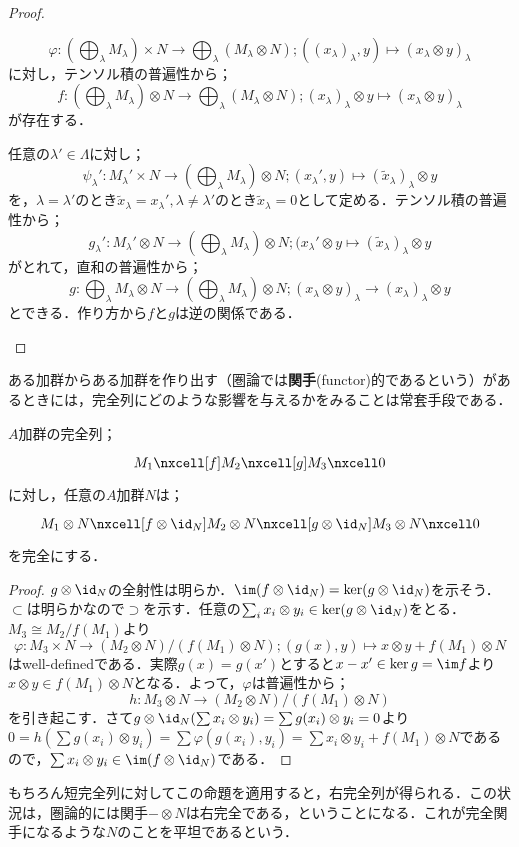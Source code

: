 \begin{proof}
\begin{step}
	\begin{mrkw}
		\item \[\varphi:\left(\bigoplus_\lambda M_\lambda\right)\times N\to\bigoplus_\lambda(M_\lambda\otimes N);((x_\lambda)_\lambda,y)\mapsto(x_\lambda\otimes y)_\lambda\]
		に対し，テンソル積の普遍性から；
		\[f:\left(\bigoplus_\lambda M_\lambda\right)\otimes N\to \bigoplus_\lambda(M_\lambda\otimes N);(x_\lambda)_\lambda\otimes y\mapsto(x_\lambda\otimes y)_\lambda\]
		が存在する．
		\item 任意の$\lambda'\in\Lambda$に対し；
		\[\psi_\lambda':M_\lambda'\times N\to\left(\bigoplus_\lambda M_\lambda\right)\otimes N;(x_\lambda',y)\mapsto(\tilde{x}_\lambda)_\lambda\otimes y\]
		を，$\lambda=\lambda'$のとき$\tilde{x}_\lambda=x_\lambda',\lambda\neq\lambda'$のとき$\tilde{x}_\lambda=0$として定める．テンソル積の普遍性から；
		\[g_\lambda':M_\lambda'\otimes N\to\left(\bigoplus_\lambda M_\lambda\right)\otimes N;(x_\lambda'\otimes y\mapsto(\tilde{x}_\lambda)_\lambda\otimes y\]
		がとれて，直和の普遍性から；
		\[g:\bigoplus_\lambda M_\lambda\otimes N\to \left(\bigoplus_\lambda M_\lambda\right)\otimes N;(x_\lambda\otimes y)_\lambda\to(x_\lambda)_\lambda\otimes y\]
		とできる．作り方から$f$と$g$は逆の関係である．
	\end{mrkw}
	\end{step}
\end{proof}

ある加群からある加群を作り出す（圏論では\textbf{関手}(functor)的であるという）があるときには，完全列にどのような影響を与えるかをみることは常套手段である．

\begin{prop}[テンソル積の右完全性]
	$A$加群の完全列；
	\[\begin{tikzcd}
	M_1\nxcell[f]M_2\nxcell[g]M_3\nxcell0
	\end{tikzcd}\]
	に対し，任意の$A$加群$N$は；
	\[\begin{tikzcd}
	M_1\otimes N\nxcell[f\otimes\id_{N}]M_2\otimes N\nxcell[g\otimes\id_{N}]M_3\otimes N\nxcell0
	\end{tikzcd}\]
	を完全にする．
\end{prop}
\begin{proof}
	$g\otimes\id_{N}$の全射性は明らか．$\im(f\otimes\id_{N})=\ker(g\otimes\id_{N})$を示そう．$\subset$は明らかなので$\supset$を示す．任意の$\sum_i x_i\otimes y_i\in\ker(g\otimes\id_{N})$をとる．$M_3\cong M_2/f(M_1)$より
	\[\varphi:M_3\times N\to (M_2\otimes N)/(f(M_1)\otimes N);(g(x),y)\mapsto x\otimes y+f(M_1)\otimes N\]
	はwell-definedである．実際$g(x)=g(x')$とすると$x-x'\in\ker g=\im f$より$x\otimes y\in f(M_1)\otimes N$となる．よって，$\varphi$は普遍性から；
	\[h:M_3\otimes N\to(M_2\otimes N)/(f(M_1)\otimes N)\]
	を引き起こす．さて$g\otimes\id_{N}(\sum x_i\otimes y_i)=\sum g(x_i)\otimes y_i=0$より$0=h(\sum g(x_i)\otimes y_i)=\sum \varphi(g(x_i),y_i)=\sum x_i\otimes y_i+f(M_1)\otimes N$であるので，$\sum x_i\otimes y_i\in\im(f\otimes\id_{N})$である．
\end{proof}
もちろん短完全列に対してこの命題を適用すると，右完全列が得られる．この状況は，圏論的には関手$-\otimes N$は右完全である，ということになる．これが完全関手になるような$N$のことを平坦であるという．

